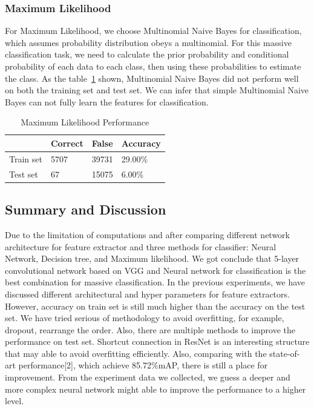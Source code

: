 \documentclass[runningheads]{llncs}
\begin{document}
\subsubsection{Maximum Likelihood}
For Maximum Likelihood, we choose Multinomial Naive Bayes for classification, which assumes probability distribution obeys a multinomial. For this massive classification task, we need to calculate the prior probability and conditional probability of each data to each class, then using these probabilities to estimate the class. As the table~\ref{tab5} shown, Multinomial Naive Bayes did not perform well on both the training set and test set. We can infer that simple Multinomial Naive Bayes can not fully learn the features for classification.

\begin{table}
	\caption{Maximum Likelihood Performance }\label{tab5}
	\begin{center}
		\begin{tabular}{|l|l|l|l|}
			\hline
			& Correct & False & Accuracy\\
			\hline
			Train set &  5707  &   39731   & 29.00\% \\
			Test set  &  67    &   15075   & 6.00\%\\
			\hline
		\end{tabular}
	\end{center}
\end{table}

\subsection{Summary and Discussion}
Due to the limitation of computations and after comparing different network architecture for feature extractor and three methods for classifier: Neural Network, Decision tree, and Maximum likelihood. We got conclude that 5-layer convolutional network based on VGG and Neural network for classification is the best combination for massive classification. In the previous experiments, we have discussed different architectural and hyper parameters for feature extractors. However, accuracy on train set is still much higher than the accuracy on the test set. We have tried serious of methodology to avoid overfitting, for example, dropout, rearrange the order. Also, there are multiple methods to improve the performance on test set. Shortcut connection in ResNet is an interesting structure that may able to avoid overfitting efficiently. Also, comparing with the state-of-art performance[2], which achieve 85.72\%mAP, there is still a place for improvement. From the experiment data we collected, we guess a deeper and more complex neural network might able to improve the performance to a higher level.
\end{document}
